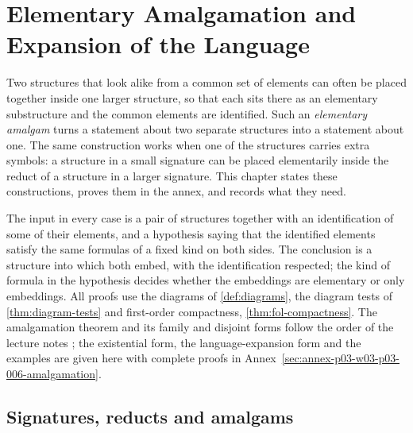 \chapter{Elementary Amalgamation and Expansion of the Language}
\label{sec:p03-w03-p03-006-amalgamation}

Two structures that look alike from a common set of elements can often be
placed together inside one larger structure, so that each sits there as an
elementary substructure and the common elements are identified.  Such an
\emph{elementary amalgam} turns a statement about two separate structures
into a statement about one.  The same construction works when one of the
structures carries extra symbols: a structure in a small signature can be
placed elementarily inside the reduct of a structure in a larger signature.
This chapter states these constructions, proves them in the annex, and
records what they need.

The input in every case is a pair of structures together with an
identification of some of their elements, and a hypothesis saying that the
identified elements satisfy the same formulas of a fixed kind on both
sides.  The conclusion is a structure into which both embed, with the
identification respected; the kind of formula in the hypothesis decides
whether the embeddings are elementary or only embeddings.  All proofs use
the diagrams of \cref{def:diagrams}, the diagram tests of
\cref{thm:diagram-tests} and first-order compactness,
\cref{thm:fol-compactness}.  The amalgamation theorem and its family and
disjoint forms follow the order of the lecture notes
\cite[Lecture~19, pp.~1--6]{Speirs2013Amalgamation}; the existential form,
the language-expansion form and the examples are given here with complete
proofs in Annex~\ref{sec:annex-p03-w03-p03-006-amalgamation}.

\section{Signatures, reducts and amalgams}
\label{sec:p03-w03-p03-006-setting}


